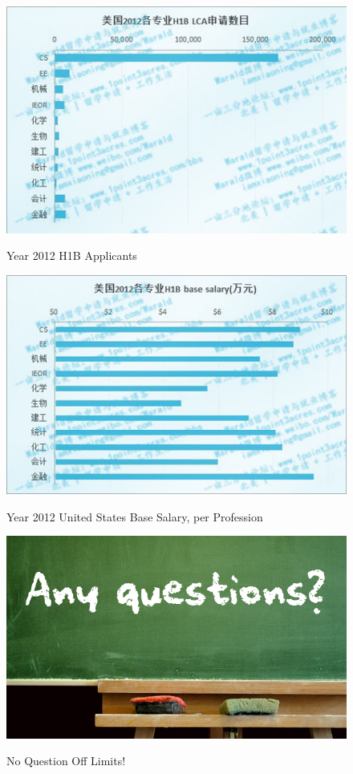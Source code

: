 \documentclass[12pt,hyperref=true,mathserif]{beamer}
\begin{document}
\begin{frame}
\begin{figure}
  \centering
  \includegraphics[scale=0.65]{H1B}\\
  \caption{Year 2012 H1B Applicants}\label{fig:H1B}
\end{figure}
\end{frame}

\begin{frame}
\begin{figure}
  \centering
  \includegraphics[scale=0.65]{Base-Salary}\\
  \caption{Year 2012 United States Base Salary, per Profession}\label{fig:BaseSalary}
\end{figure}
\end{frame}

\begin{frame}
\begin{figure}
  \centering
  \includegraphics[scale=0.45]{Question}\\
  \caption{No Question Off Limits!}\label{fig:QuestionandAnswer}
\end{figure}

\end{frame}
\end{document}
